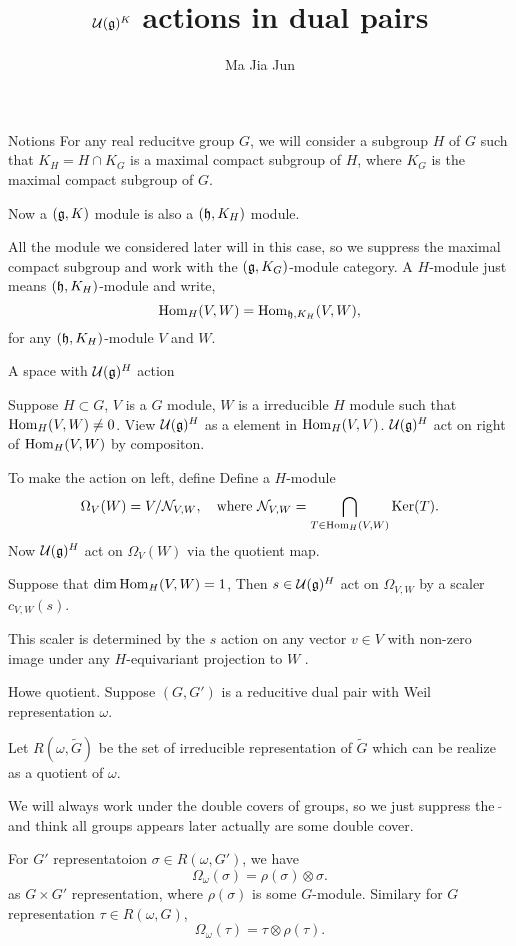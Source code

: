 \documentclass{beamer}
\begin{document}


\title[$\cuu(\fgg)^K$ in dual pairs]{$\cuu(\fgg)^K$ actions in dual pairs}
\author{Ma Jia Jun}

\begin{frame}[plain]
  \titlepage
\end{frame}

\begin{frame}{Notions}
For any real reducitve group $G$, 
we will consider a subgroup $H$ of $G$ such that $K_H = H\cap K_G$ is a maximal 
compact subgroup of $H$, where $K_G$ is the maximal compact subgroup of $G$.

Now a $(\mathfrak{g},K)$ module is also a $(\mathfrak{h},K_H)$ module.

All the module we considered later will in this case, 
so we suppress the maximal compact subgroup and work with 
the $(\mathfrak{g},K_G)$-module category.
A $H$-module just means $(\mathfrak{h},K_H)$-module and write,
\[
{\rm Hom}_{H}(V,W) = {\rm Hom}_{\mathfrak{h},K_H}(V,W),
\]
for any $(\mathfrak{h},K_H)$-module $V$ and $W$.
\end{frame}

\begin{frame}{A space with $\mathcal{U}(\mathfrak{g})^H$ action}


Suppose $H\subset G$,  $V$ is a $G$ module, $W$ is a irreducible $H$ module
 such that
${\rm Hom}_{H}(V,W)\neq 0$.
View $\mathcal{U}(\mathfrak{g})^H$ as a element in ${\rm Hom}_H(V,V)$. 
$\mathcal{U}(\mathfrak{g})^H$ act on right 
of ${\rm Hom}_H(V,W)$ by compositon.

To make the action on left, define
Define a $H$-module \[
\Omega_V(W) = V / \mathcal{N}_{V,W},
\quad \text{where }
\mathcal{N}_{V,W} = \bigcap_{T\in {\rm Hom}_H(V,W)}{\rm Ker}(T).
\]
Now $\mathcal{U}(\mathfrak{g})^H$ act on $\Omega_V(W)$ via the quotient map.

\begin{lemma}
Suppose that $\dim {\rm Hom}_{H}(V,W)=1$,
Then $s \in \mathcal{U}(\mathfrak{g})^H$ act on $\Omega_{V,W}$ by a  scaler $c_{V,W}(s)$.
\end{lemma}
\rmk This scaler is determined by the $s$ action on any vector $v\in V$ with 
non-zero image under any $H$-equivariant projection to $W$ .

\end{frame}


\begin{frame}{Howe quotient.}
Suppose $(G,G')$ is a reducitive dual pair with 
Weil representation $\omega$.

Let $R(\omega,\widetilde{G})$
be the set of irreducible  representation of $\widetilde{G}$
which can be realize as a quotient of $\omega$.

We will always work under the double covers of groups, so
we just suppress the $\widetilde{\ \  }$ and think all groups 
appears later actually are some double cover.

For $G'$ representatoion $\sigma \in R(\omega,G')$, we have
\[
 \Omega_\omega(\sigma) = \rho(\sigma)\otimes \sigma.
\]
 as $G\times G'$ representation, where $\rho(\sigma)$ is some $G$-module.
Similary for $G$ representation $\tau\in R(\omega,G)$,
\[
 \Omega_\omega(\tau) = \tau\otimes \rho(\tau).
\]

\end{frame}
\end{document}
